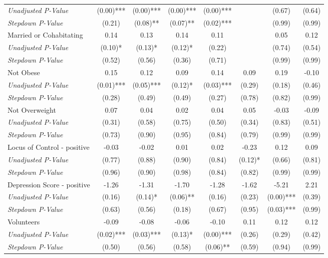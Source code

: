 \begin{tabular}{l c c c c c c c}
\quad \textit{Unadjusted P-Value} & (0.00)*** & (0.00)*** & (0.00)*** & (0.00)*** & & (0.67) & (0.64) \\
\quad \textit{Stepdown P-Value} & (0.21) & (0.08)** & (0.07)** & (0.02)*** & & (0.99) & (0.99) \\
Married or Cohabitating & 0.14 & 0.13 & 0.14 & 0.11 & & 0.05 & 0.12 \\
\quad \textit{Unadjusted P-Value} & (0.10)* & (0.13)* & (0.12)* & (0.22) & & (0.74) & (0.54) \\
\quad \textit{Stepdown P-Value} & (0.52) & (0.56) & (0.36) & (0.71) & & (0.99) & (0.99) \\
Not Obese & 0.15 & 0.12 & 0.09 & 0.14 & 0.09 & 0.19 & -0.10 \\
\quad \textit{Unadjusted P-Value} & (0.01)*** & (0.05)*** & (0.12)* & (0.03)*** & (0.29) & (0.18) & (0.46) \\
\quad \textit{Stepdown P-Value} & (0.28) & (0.49) & (0.49) & (0.27) & (0.78) & (0.82) & (0.99) \\
Not Overweight & 0.07 & 0.04 & 0.02 & 0.04 & 0.05 & -0.03 & -0.09 \\
\quad \textit{Unadjusted P-Value} & (0.31) & (0.58) & (0.75) & (0.50) & (0.34) & (0.83) & (0.51) \\
\quad \textit{Stepdown P-Value} & (0.73) & (0.90) & (0.95) & (0.84) & (0.79) & (0.99) & (0.99) \\
Locus of Control - positive & -0.03 & -0.02 & 0.01 & 0.02 & -0.23 & 0.12 & 0.09 \\
\quad \textit{Unadjusted P-Value} & (0.77) & (0.88) & (0.90) & (0.84) & (0.12)* & (0.66) & (0.81) \\
\quad \textit{Stepdown P-Value} & (0.96) & (0.90) & (0.98) & (0.84) & (0.82) & (0.99) & (0.99) \\
Depression Score - positive & -1.26 & -1.31 & -1.70 & -1.28 & -1.62 & -5.21 & 2.21 \\
\quad \textit{Unadjusted P-Value} & (0.16) & (0.14)* & (0.06)** & (0.16) & (0.23) & (0.00)*** & (0.39) \\
\quad \textit{Stepdown P-Value} & (0.63) & (0.56) & (0.18) & (0.67) & (0.95) & (0.03)*** & (0.99) \\
Volunteers & -0.09 & -0.08 & -0.06 & -0.10 & 0.11 & 0.12 & 0.12 \\
\quad \textit{Unadjusted P-Value} & (0.02)*** & (0.03)*** & (0.13)* & (0.00)*** & (0.26) & (0.29) & (0.42) \\
\quad \textit{Stepdown P-Value} & (0.50) & (0.56) & (0.58) & (0.06)** & (0.59) & (0.94) & (0.99) \\

\end{tabular}
